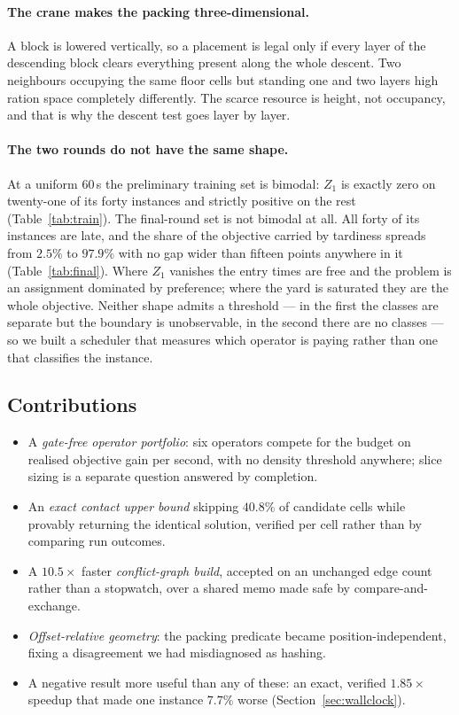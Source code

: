 \documentclass[runningheads]{llncs}
\begin{document}
\paragraph{The crane makes the packing three-dimensional.}
A block is lowered vertically, so a placement is legal only if every layer of the descending block
clears everything present along the whole descent. Two neighbours occupying the same floor cells
but standing one and two layers high ration space completely differently. The scarce resource is
height, not occupancy, and that is why the descent test goes layer by layer.

\paragraph{The two rounds do not have the same shape.}
At a uniform $60$\,s the preliminary training set is bimodal: $Z_1$ is exactly zero on twenty-one of
its forty instances and strictly positive on the rest (Table~\ref{tab:train}). The final-round
set is not bimodal at all. All forty of its instances are late, and the share of the objective
carried by tardiness spreads from $2.5\%$ to $97.9\%$ with no gap wider than fifteen points
anywhere in it (Table~\ref{tab:final}). Where $Z_1$ vanishes the entry times are free and the problem is an
assignment dominated by preference; where the yard is saturated they are the whole objective.
Neither shape admits a threshold --- in the first the classes are separate but the boundary is
unobservable, in the second there are no classes --- so we built a scheduler that measures which
operator is paying rather than one that classifies the instance.

\subsection{Contributions}

\begin{itemize}
\itemsep0pt
\item A \emph{gate-free operator portfolio}: six operators compete for the budget on realised
objective gain per second, with no density threshold anywhere; slice sizing is a separate question
answered by completion.
\item An \emph{exact contact upper bound} skipping $40.8\%$ of candidate cells while provably
returning the identical solution, verified per cell rather than by comparing run outcomes.
\item A $10.5\times$ faster \emph{conflict-graph build}, accepted on an unchanged edge count rather
than a stopwatch, over a shared memo made safe by compare-and-exchange.
\item \emph{Offset-relative geometry}: the packing predicate became position-independent,
fixing a disagreement we had misdiagnosed as hashing.
\item A negative result more useful than any of these: an exact, verified $1.85\times$ speedup that
made one instance $7.7\%$ worse (Section~\ref{sec:wallclock}).
\end{itemize}
\end{document}
